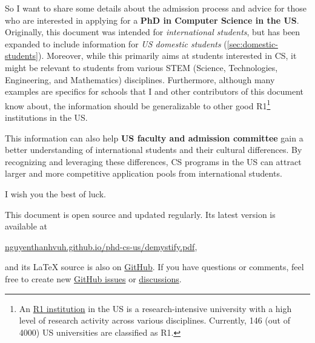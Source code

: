 \documentclass[oneside,11pt,dvipsnames]{book}
\begin{document}
So I want to share some details about the admission process and advice for those who are interested in applying for a \textbf{PhD in Computer Science in the US}.
Originally, this document was intended for \emph{international students}, but has been expanded to include information for \emph{US domestic students} (\autoref{sec:domestic-students}).
Moreover, while this primarily aims at students interested in CS, it might be relevant to students from various STEM (Science, Technologies, Engineering, and Mathematics) disciplines.
Furthermore, although many examples are specifics for schools that I and other contributors of this document know about, the information should be generalizable to other good R1\footnote{An \href{https://en.wikipedia.org/wiki/List_of_research_universities_in_the_United_States}{R1 institution} in the US is a research-intensive university with a high level of research activity across various disciplines. Currently, 146 (out of 4000) US universities are classified as R1.} institutions in the US.

This information can also help \textbf{US faculty and admission committee} gain a better understanding of international students and their cultural differences.  By recognizing and leveraging these differences, CS programs in the US can attract larger and more competitive application pools from international students.

I wish you the best of luck.

\begin{mybox}
This document is open source and updated regularly. Its latest version is available at

\begin{center}
  \href{https://nguyenthanhvuh.github.io/phd-cs-us/demystify.pdf}{nguyenthanhvuh.github.io/phd-cs-us/demystify.pdf},
\end{center}

\noindent and its \LaTeX{} source is also on \href{https://github.com/nguyenthanhvuh/phd-cs-us}{GitHub}. If you have questions or comments, feel free to create new \href{https://github.com/nguyenthanhvuh/phd-cs-us/issues}{GitHub issues} or \href{https://github.com/nguyenthanhvuh/phd-cs-us/discussions}{discussions}.

\end{mybox}

\newpage
\renewcommand{\contentsname}{Contents and Summary}
\tableofcontents
\end{document}
